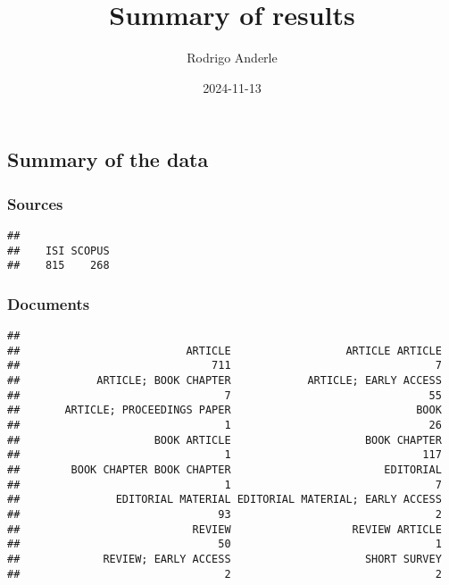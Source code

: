 \documentclass[
]{article}
\title{Summary of results}
\author{Rodrigo Anderle}
\date{2024-11-13}
\newenvironment{Shaded}{\begin{snugshade}}{\end{snugshade}}
\newcommand{\FunctionTok}[1]{\textcolor[rgb]{0.13,0.29,0.53}{\textbf{#1}}}
\newcommand{\NormalTok}[1]{#1}
\newcommand{\SpecialCharTok}[1]{\textcolor[rgb]{0.81,0.36,0.00}{\textbf{#1}}}
\begin{document}
\maketitle

\subsection{Summary of the data}\label{summary-of-the-data}

\subsubsection{Sources}\label{sources}

\begin{Shaded}
\end{Shaded}

\begin{verbatim}
## 
##    ISI SCOPUS 
##    815    268
\end{verbatim}

\subsubsection{Documents}\label{documents}

\begin{Shaded}
\end{Shaded}

\begin{verbatim}
## 
##                          ARTICLE                  ARTICLE ARTICLE 
##                              711                                7 
##            ARTICLE; BOOK CHAPTER            ARTICLE; EARLY ACCESS 
##                                7                               55 
##       ARTICLE; PROCEEDINGS PAPER                             BOOK 
##                                1                               26 
##                     BOOK ARTICLE                     BOOK CHAPTER 
##                                1                              117 
##        BOOK CHAPTER BOOK CHAPTER                        EDITORIAL 
##                                1                                7 
##               EDITORIAL MATERIAL EDITORIAL MATERIAL; EARLY ACCESS 
##                               93                                2 
##                           REVIEW                   REVIEW ARTICLE 
##                               50                                1 
##             REVIEW; EARLY ACCESS                     SHORT SURVEY 
##                                2                                2
\end{verbatim}
\end{document}
